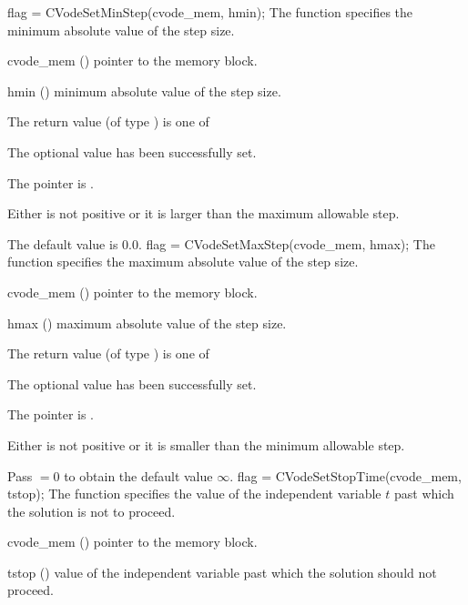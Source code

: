 {
flag = CVodeSetMinStep(cvode\_mem, hmin);
}
{
  The function  specifies the minimum absolute
  value of the step size.
}
{
  \begin{args}
  \item[cvode\_mem] ()
    pointer to the {\cvode} memory block.
  \item[hmin] ()
    minimum absolute value of the step size.
  \end{args}
}
{
  The return value  (of type ) is one of
  \begin{args}
  \item[\Id{CV\_SUCCESS}] 
    The optional value has been successfully set.
  \item[\Id{CV\_MEM\_NULL}]
    The  pointer is .
  \item[\Id{CV\_ILL\_INPUT}]
    Either  is not positive or it is larger than the maximum allowable step.
  \end{args}
}
{
  The default value is $0.0$.
}
{
flag = CVodeSetMaxStep(cvode\_mem, hmax);
}
{
  The function  specifies the maximum absolute
  value of the step size.
}
{
  \begin{args}
  \item[cvode\_mem] ()
    pointer to the {\cvode} memory block.
  \item[hmax] ()
    maximum absolute value of the step size.
  \end{args}
}
{
  The return value  (of type ) is one of
  \begin{args}
  \item[\Id{CV\_SUCCESS}] 
    The optional value has been successfully set.
  \item[\Id{CV\_MEM\_NULL}]
    The  pointer is .
  \item[\Id{CV\_ILL\_INPUT}]
    Either  is not positive or it is smaller than the minimum allowable step.
  \end{args}
}
{
  Pass $=0$ to obtain the default value $\infty$.
}
{
flag = CVodeSetStopTime(cvode\_mem, tstop);
}
{
  The function  specifies the value of the
  independent variable $t$ past which the solution is not to proceed.
}
{
  \begin{args}
  \item[cvode\_mem] ()
    pointer to the {\cvode} memory block.
  \item[tstop] ()
    value of the independent variable past which the solution should
    not proceed.
  \end{args}
}
